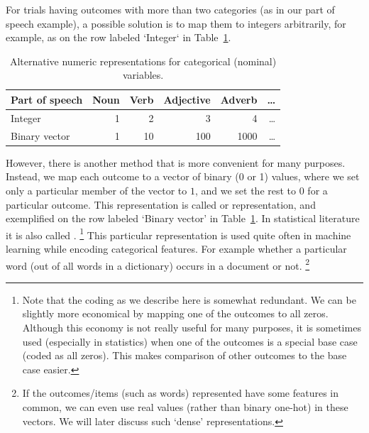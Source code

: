 For trials having outcomes with more than two categories
(as in our part of speech example),
a possible solution is to map them to integers arbitrarily,
for example,
as on the row labeled `Integer` in Table~\ref{tbl:nominal-repr}.
\begin{table}
  \begin{tabular}{lrrrrr}
    \toprule
    Part of speech            & Noun & Verb  & Adjective  & Adverb & \ldots \\
    \midrule
    Integer       & \num{1} & \num{2}  & \num{3}  & \num{4} & \ldots \\
    Binary vector &\num[minimum-integer-digits=6,group-digits=false]{1}
                  &\num[minimum-integer-digits=6,group-digits=false]{10}
                  &\num[minimum-integer-digits=6,group-digits=false]{100}
                  &\num[minimum-integer-digits=6,group-digits=false]{1000}
                  &\ldots \\
    \bottomrule
  \end{tabular}
  \caption{
    Alternative numeric representations for categorical (nominal) variables.
  }\label{tbl:nominal-repr}%
\end{table}

However, there is another method that is more convenient for many purposes.
Instead,
we map each outcome to a vector of binary (\num{0} or \num{1}) values,
where we set only a particular member of the vector to $1$,
and we set the rest to \num{0} for a particular outcome.
This representation is called  or  representation,
and exemplified on the row labeled `Binary vector' in Table~\ref{tbl:nominal-repr}.
\label{desc:one-hot}
In statistical literature it is also called .%
\footnote{%
  Note that the coding as we describe here is somewhat redundant.
  We can be slightly more economical by mapping
  one of the outcomes to all zeros.
  Although this economy is not really useful for many purposes,
  it is sometimes used (especially in statistics)
  when one of the outcomes is a special base case (coded as all zeros).
  This makes comparison of other outcomes to the base case easier.
}
This particular representation is used quite often in machine learning
while encoding categorical features.
For example whether a particular word (out of all words in a dictionary)
occurs in a document or not.%
\footnote{%
  If the outcomes/items (such as words) represented have some features
  in common,
  we can even use real values (rather than binary one-hot) in these vectors.
  We will later discuss such `dense' representations.
}

